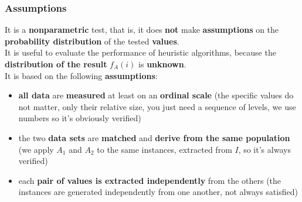 \newpage

\subsubsection{Assumptions} 
It is a \textbf{nonparametric} test, that is, it does \textbf{not} make \textbf{assumptions} on the \textbf{probability distribution} of the tested \textbf{values}.\\

It is useful to evaluate the performance of heuristic algorithms, because the \textbf{distribution of the result} $f_A (i )$ is \textbf{unknown}. \\

It is based on the following \textbf{assumptions}:
\begin{itemize}
	\item \textbf{all data} are \textbf{measured} at least on an \textbf{ordinal scale} (the specific values do not matter, only their relative size, you just need a sequence of levels, we use numbers so it's obviously verified)
	\item the two \textbf{data sets} are \textbf{matched} and \textbf{derive from the same population} (we apply $A_1$ and $A_2$ to the same instances, extracted from $I$, so it's always verified)
	\item each \textbf{pair of values is extracted independently} from the others (the instances are generated independently from one another, not always satisfied)
\end{itemize}

\newpage


